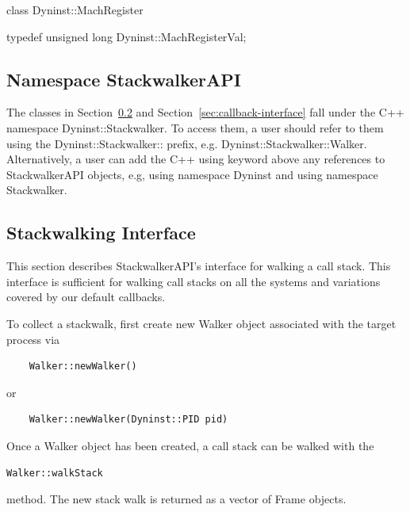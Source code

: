 \begin{apient}
class Dyninst::MachRegister
\end{apient}

\begin{apient}
typedef unsigned long Dyninst::MachRegisterVal;
\end{apient}

\subsection{Namespace StackwalkerAPI}
The classes in Section~\ref{sec:stackwalking-interface} and
Section~\ref{sec:callback-interface} fall under the C++ namespace
Dyninst::Stackwalker. To access them, a user should refer to them using the
Dyninst::Stackwalker:: prefix, e.g. Dyninst::Stackwalker::Walker. Alternatively,
a user can add the C++ using keyword above any references to StackwalkerAPI
objects, e.g, using namespace Dyninst and using namespace Stackwalker.

\subsection{Stackwalking Interface}
\label{sec:stackwalking-interface}

This section describes StackwalkerAPI's interface for walking a call stack. This
interface is sufficient for walking call stacks on all the systems and
variations covered by our default callbacks.

To collect a stackwalk, first create new Walker object associated with the target process via

\begin{lstlisting}
    Walker::newWalker()
\end{lstlisting}
	or
\begin{lstlisting}
    Walker::newWalker(Dyninst::PID pid)
\end{lstlisting}

Once a Walker object has been created, a call stack can be walked with the
\begin{lstlisting}
Walker::walkStack
\end{lstlisting}
method. The new stack walk is returned as a vector of Frame objects.




